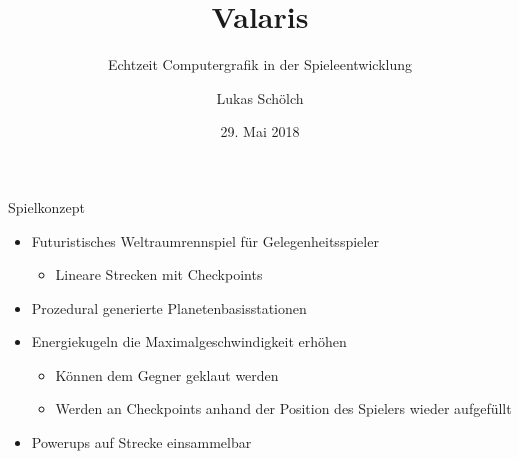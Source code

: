 \documentclass[10pt]{beamer}
\title{Valaris}
\subtitle{Echtzeit Computergrafik in der Spieleentwicklung}
\date{29. Mai 2018}
\author{Lukas Schölch}
\begin{document}
\maketitle

\begin{frame}[fragile]{Spielkonzept}

  \begin{itemize}
    \item Futuristisches Weltraumrennspiel für Gelegenheitsspieler
        \begin{itemize}
            \item Lineare Strecken mit Checkpoints
        \end{itemize}
    \item Prozedural generierte Planetenbasisstationen
    \item Energiekugeln die Maximalgeschwindigkeit erhöhen
        \begin{itemize}
            \item Können dem Gegner geklaut werden
            \item Werden an Checkpoints anhand der Position des Spielers wieder aufgefüllt
        \end{itemize}
    \item Powerups auf Strecke einsammelbar
    
  \end{itemize}
  
  
\end{frame}
\end{document}
